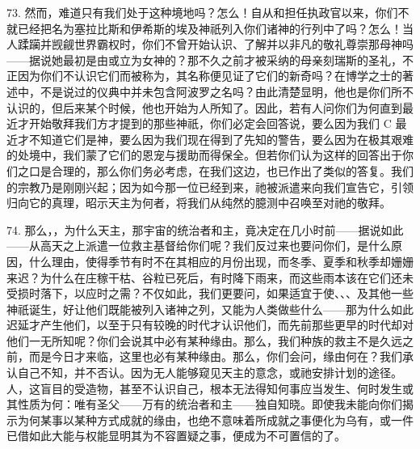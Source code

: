 73. 然而，难道只有我们处于这种境地吗？怎么！自从和担任执政官以来，你们不就已经把名为塞拉比斯和伊希斯的埃及神祇列入你们诸神的行列中了吗？怎么！当人蹂躏并觊觎世界霸权时，你们不曾开始认识、了解并以非凡的敬礼尊崇那母神吗——据说她最初是由或立为女神的？那不久之前才被采纳的母亲刻瑞斯的圣礼，不正因为你们不认识它们而被称为，其名称便见证了它们的新奇吗？在博学之士的著述中，不是说过的仪典中并未包含阿波罗之名吗？由此清楚显明，他也是你们所不认识的，但后来某个时候，他也开始为人所知了。因此，若有人问你们为何直到最近才开始敬拜我们方才提到的那些神祇，你们必定会回答说，要么因为我们 C 最近才不知道它们是神，要么因为我们现在得到了先知的警告，要么因为在极其艰难的处境中，我们蒙了它们的恩宠与援助而得保全。但若你们认为这样的回答出于你们之口是合理的，那么你们务必考虑，在我们这边，也已作出了类似的答复。我们的宗教乃是刚刚兴起；因为如今那一位已经到来，祂被派遣来向我们宣告它，引领归向它的真理，昭示天主为何者，将我们从纯然的臆测中召唤至对祂的敬拜。\par

74. 那么，，为什么天主，那宇宙的统治者和主，竟决定在几小时前——据说如此——从高天之上派遣一位救主基督给你们呢？我们反过来也要问你们，是什么原因，什么理由，使得季节有时不在其相应的月份出现，而冬季、夏季和秋季却姗姗来迟？为什么在庄稼干枯、谷粒已死后，有时降下雨来，而这些雨本该在它们还未受损时落下，以应时之需？不仅如此，我们更要问，如果适宜于使、、、及其他一些神祇诞生，好让他们既能被列入诸神之列，又能为人类做些什么——那为什么如此迟延才产生他们，以至于只有较晚的时代才认识他们，而先前那些更早的时代却对他们一无所知呢？你们会说其中必有某种缘由。那么，我们种族的救主不是久远之前，而是今日才来临，这里也必有某种缘由。那么，你们会问，缘由何在？我们承认自己不知，并不否认。因为无人能够窥见天主的意念，或祂安排计划的途径。人，这盲目的受造物，甚至不认识自己，根本无法得知何事应当发生、何时发生或其性质为何：唯有圣父——万有的统治者和主——独自知晓。即使我未能向你们揭示为何某事以某种方式成就的缘由，也绝不意味着所成就之事便化为乌有，或一件已借如此大能与权能显明其为不容置疑之事，便成为不可置信的了。\par

